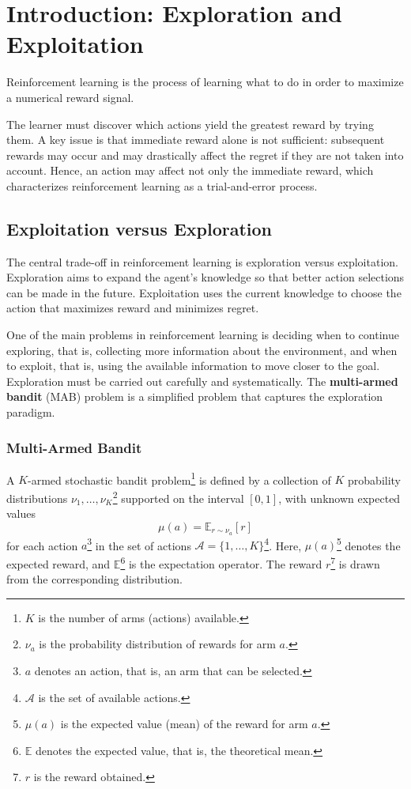 \chapter{Introduction: Exploration and Exploitation}
\label{ch:introduction}

\begin{definition}
Reinforcement learning is the process of learning what to do in order to maximize a numerical reward signal.
\end{definition}

The learner must discover which actions yield the greatest reward by trying them. A key issue is that immediate reward alone is not sufficient: subsequent rewards may occur and may drastically affect the regret if they are not taken into account. Hence, an action may affect not only the immediate reward, which characterizes reinforcement learning as a trial-and-error process.

\section{Exploitation versus Exploration}
The central trade-off in reinforcement learning is exploration versus exploitation. Exploration aims to expand the agent's knowledge so that better action selections can be made in the future. Exploitation uses the current knowledge to choose the action that maximizes reward and minimizes regret.

One of the main problems in reinforcement learning is deciding when to continue exploring, that is, collecting more information about the environment, and when to exploit, that is, using the available information to move closer to the goal. Exploration must be carried out carefully and systematically. The \textbf{multi-armed bandit} (MAB) problem is a simplified problem that captures the exploration paradigm.

\subsection{Multi-Armed Bandit}
A \(K\)-armed stochastic bandit problem\footnote{\(K\) is the number of arms (actions) available.} is defined by a collection of \(K\) probability distributions \(\nu_1, \dots, \nu_K\)\footnote{\(\nu_a\) is the probability distribution of rewards for arm \(a\).} supported on the interval \([0,1]\), with unknown expected values
\[
\mu(a) = \mathbb{E}_{r \sim \nu_a}[r]
\]
for each action \(a\)\footnote{\(a\) denotes an action, that is, an arm that can be selected.} in the set of actions \(\mathcal{A} = \{1, \dots, K\}\)\footnote{\(\mathcal{A}\) is the set of available actions.}. Here, \(\mu(a)\)\footnote{\(\mu(a)\) is the expected value (mean) of the reward for arm \(a\).} denotes the expected reward, and \(\mathbb{E}\)\footnote{\(\mathbb{E}\) denotes the expected value, that is, the theoretical mean.} is the expectation operator. The reward \(r\)\footnote{\(r\) is the reward obtained.} is drawn from the corresponding distribution.

